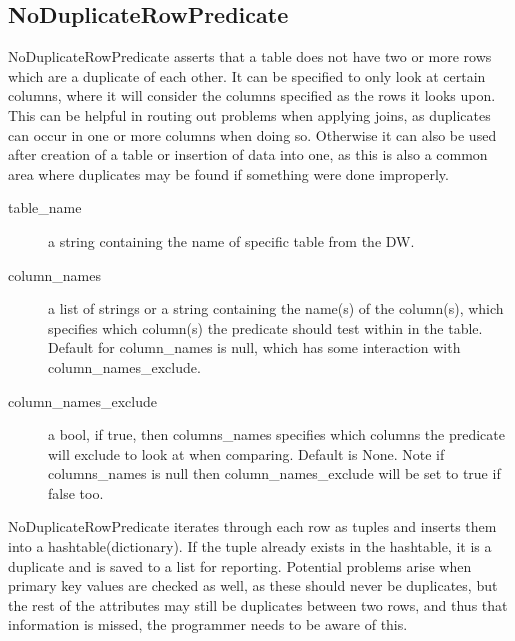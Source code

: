 \subsection{NoDuplicateRowPredicate}

NoDuplicateRowPredicate asserts that a table does not have two or more rows which are a duplicate of each other. It can be specified to only look at certain columns, where it will consider the columns specified as the rows it looks upon. This can be helpful in routing out problems when applying joins, as duplicates can occur in one or more columns when doing so. Otherwise it can also be used after creation of a table or insertion of data into one, as this is also a common area where duplicates may be found if something were done improperly.
 

\begin{description}
\item [table\_name] a string containing the name of specific table from the DW. 
\item [column\_names] a list of strings or a string containing the name(s) of the column(s), which specifies which column(s) the predicate should test within in the table. Default for column\_names is null, which has some interaction with column\_names\_exclude.
\item [column\_names\_exclude] a bool, if true, then columns\_names specifies which columns the predicate will exclude to look at when comparing. Default is None. Note if columns\_names is null then column\_names\_exclude will be set to true if false too.
\end{description}

NoDuplicateRowPredicate iterates through each row as tuples and inserts them into a hashtable(dictionary). If the tuple already exists in the hashtable, it is a duplicate and is saved to a list for reporting.
Potential problems arise when primary key values are checked as well, as these should never be duplicates, but the rest of the attributes may still be duplicates between two rows, and thus that information is missed, the programmer needs to be aware of this.
